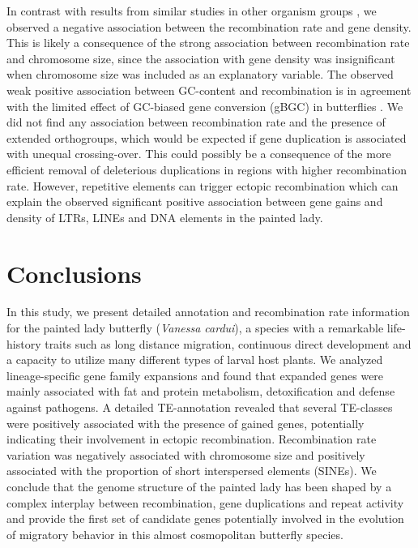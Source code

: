 \documentclass[twocolumn]{bmcart}%
\begin{document}
In contrast with results from similar studies in other organism groups \citep{apuliInferringGenomicLandscape2020, kawakamiHighdensityLinkageMap2014}, we observed a negative association between the recombination rate and gene density. This is likely a consequence of the strong association between recombination rate and chromosome size, since the association with gene density was insignificant when chromosome size was included as an explanatory variable. The observed weak positive association between GC-content and recombination is in agreement with the limited effect of GC-biased gene conversion (gBGC) in butterflies \citep{bomanEffectsGCBiasedGene2021}. We did not find any association between recombination rate and the presence of extended orthogroups, which would be expected if gene duplication is associated with unequal crossing-over. This could possibly be a consequence of the more efficient removal of deleterious duplications in regions with higher recombination rate. However, repetitive elements can trigger ectopic recombination which can explain the observed significant positive association between gene gains and density of LTRs, LINEs and DNA elements in the painted lady.

\section*{Conclusions}
In this study, we present detailed annotation and recombination rate information for the painted lady butterfly (\textit{Vanessa cardui}), a species with a remarkable life-history traits such as long distance migration, continuous direct development and a capacity to utilize many different types of larval host plants. We analyzed lineage-specific gene family expansions and found that expanded genes were mainly associated with fat and protein metabolism, detoxification and defense against pathogens. A detailed TE-annotation revealed that several TE-classes were positively associated with the presence of gained genes, potentially indicating their involvement in ectopic recombination. Recombination rate variation was negatively associated with chromosome size and positively associated with the proportion of short interspersed elements (SINEs). We conclude that the genome structure of the painted lady has been shaped by a complex interplay between recombination, gene duplications and repeat activity and provide the first set of candidate genes potentially involved in the evolution of migratory behavior in this almost cosmopolitan butterfly species.
\end{document}
